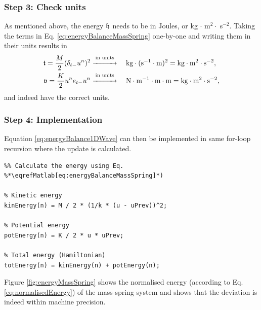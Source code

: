 {{\subsubsection{Step 3: Check units}
As mentioned above, the energy $\mathfrak{h}$ needs to be in Joules, or kg $\cdot$ m$^2 \cdot$ s$^{-2}$. Taking the terms in Eq. \eqref{eq:energyBalanceMassSpring} one-by-one and writing them in their units results in 
\begin{align*}
    \mathfrak{t} = \frac{M}{2}(\delta_{t-}u^n)^2 &\overset{\text{in units}}{\xrightarrow{\hspace*{1cm}}} \quad\text{kg}\cdot(\text{s}^{-1}\cdot \text{m})^{2}= \text{kg}\cdot\text{m}^2\cdot\text{s}^{-2},\\
    \mathfrak{v} = \frac{K}{2}u^n e_{t-}u^n&\overset{\text{in units}}{\xrightarrow{\hspace*{1cm}}} \quad \text{N} \cdot \text{m}^{-1} \cdot \text{m}\cdot \text{m} = \text{kg}\cdot\text{m}^2\cdot\text{s}^{-2},
\end{align*}
and indeed have the correct units. 

\subsubsection{Step 4: Implementation}
Equation \eqref{eq:energyBalance1DWave} can then be implemented in same for-loop recursion where the update is calculated.  
\setlstMAT
\begin{lstlisting}
%% Calculate the energy using Eq. %*\eqrefMatlab[eq:energyBalanceMassSpring]*) 

% Kinetic energy
kinEnergy(n) = M / 2 * (1/k * (u - uPrev))^2;

% Potential energy
potEnergy(n) = K / 2 * u * uPrev;

% Total energy (Hamiltonian)
totEnergy(n) = kinEnergy(n) + potEnergy(n);
\end{lstlisting}
Figure \ref{fig:energyMassSpring} shows the normalised energy (according to Eq. \eqref{eq:normalisedEnergy}) of the mass-spring system and shows that the deviation is indeed within machine precision. 

\begin{figure}[h]
    \centering
\end{figure}}}

